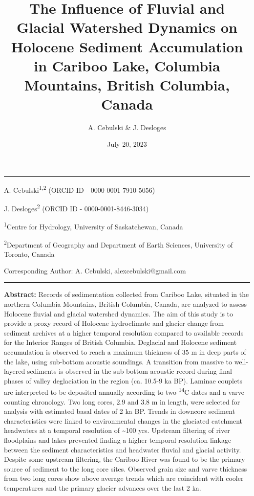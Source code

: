 \documentclass[
  letterpaper,
  DIV=11,
  numbers=noendperiod]{scrartcl}
\title{The Influence of Fluvial and Glacial Watershed Dynamics on
Holocene Sediment Accumulation in Cariboo Lake, Columbia Mountains,
British Columbia, Canada}
\author{A. Cebulski \& J. Desloges}
\date{July 20, 2023}
\begin{document}
\maketitle
\ifdefined\Shaded\renewenvironment{Shaded}{\begin{tcolorbox}[sharp corners, breakable, interior hidden, boxrule=0pt, enhanced, borderline west={3pt}{0pt}{shadecolor}, frame hidden]}{\end{tcolorbox}}\fi

\begin{center}\rule{0.5\linewidth}{0.5pt}\end{center}

A. Cebulski\textsuperscript{1,2} (ORCID ID - 0000-0001-7910-5056)

J. Desloges\textsuperscript{2} (ORCID ID - 0000-0001-8446-3034)

\textsuperscript{1}Centre for Hydrology, University of Saskatchewan,
Canada

\textsuperscript{2}Department of Geography and Department of Earth
Sciences, University of Toronto, Canada

Corresponding Author: A. Cebulski, alexcebulski@gmail.com

\begin{center}\rule{0.5\linewidth}{0.5pt}\end{center}

\pagebreak

\textbf{Abstract:} Records of sedimentation collected from Cariboo Lake,
situated in the northern Columbia Mountains, British Columbia, Canada,
are analyzed to assess Holocene fluvial and glacial watershed dynamics.
The aim of this study is to provide a proxy record of Holocene
hydroclimate and glacier change from sediment archives at a higher
temporal resolution compared to available records for the Interior
Ranges of British Columbia. Deglacial and Holocene sediment accumulation
is observed to reach a maximum thickness of 35 m in deep parts of the
lake, using sub-bottom acoustic soundings. A transition from massive to
well-layered sediments is observed in the sub-bottom acoustic record
during final phases of valley deglaciation in the region (ca. 10.5-9 ka
BP). Laminae couplets are interpreted to be deposited annually according
to two \textsuperscript{14}C dates and a varve counting chronology. Two
long cores, 2.9 and 3.8 m in length, were selected for analysis with
estimated basal dates of 2 ka BP. Trends in downcore sediment
characteristics were linked to environmental changes in the glaciated
catchment headwaters at a temporal resolution of \textasciitilde100 yrs.
Upstream filtering of river floodplains and lakes prevented finding a
higher temporal resolution linkage between the sediment characteristics
and headwater fluvial and glacial activity. Despite some upstream
filtering, the Cariboo River was found to be the primary source of
sediment to the long core sites. Observed grain size and varve thickness
from two long cores show above average trends which are coincident with
cooler temperatures and the primary glacier advances over the last 2 ka.
\end{document}
